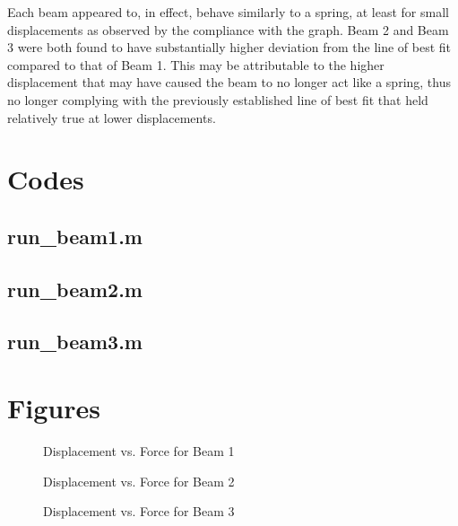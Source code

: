 \documentclass{article}
\begin{document}
Each beam appeared to, in effect, behave similarly to a spring, at least for small displacements as observed by the compliance with the graph. Beam 2 and Beam 3 were both found to have substantially higher deviation from the line of best fit compared to that of Beam 1. This may be attributable to the higher displacement that may have caused the beam to no longer act like a spring, thus no longer complying with the previously established line of best fit that held relatively true at lower displacements.

\pagebreak

\appendix
\section{Codes}


\lstset{style=python103, language=python} 
\subsection{run\_beam1.m}

\pagebreak %
\subsection{run\_beam2.m}

\pagebreak  %
\subsection{run\_beam3.m}

\pagebreak  %
\section{Figures}
\begin{figure}[htb]
\begin{center}
\caption{Displacement vs. Force for Beam 1}
\end{center}
\end{figure}

\begin{figure}[htb]
\begin{center}
\caption{Displacement vs. Force for Beam 2}
\end{center}
\end{figure}

\begin{figure}[htb]
\begin{center}
\caption{Displacement vs. Force for Beam 3}
\end{center}
\end{figure}
\end{document}
